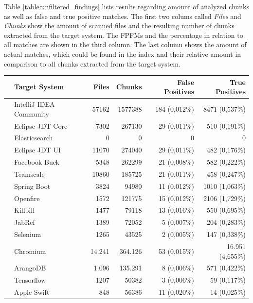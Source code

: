 Table \autoref{table:unfiltered_findings} lists results regarding amount of analyzed chunks as well as false and true positive matches.
The first two colums called \textit{Files} and \textit{Chunks} show the amount of scanned files and the resulting number of chunks extracted from the target system.
The FPFMs and the percentage in relation to all matches are shown in the third column.
The last column shows the amount of actual matches, which could be found in the index and their relative amount in comparison to all chunks extracted from the target system.

\begin{table}[ht]
	\centering
	\begin{tabular}{l|lrrrr}
		 & \textbf{Target System} & \textbf{Files} & \textbf{Chunks} & \textbf{False Positives} & \textbf{True Positives} \\ 
		\hline 
		\parbox[t]{2mm}{} 
		& IntelliJ IDEA Community & 57162 & 1577388 & 184 (0,012\%) & 8471 (0,537\%) \\
		& Eclipse JDT Core & 7302 & 267130 & 29 (0,011\%) & 510 (0,191\%) \\
		& Elasticsearch & 0 & 0 & 0 & 0  \\
		& Eclipse JDT UI & 11070 & 274040 & 29 (0,011\%) & 482 (0,176\%) \\
		& Facebook Buck & 5348 & 262299 & 21 (0,008\%) & 582 (0,222\%) \\
		& Teamscale & 10860 & 185725 & 21 (0,011\%) & 458 (0,247\%) \\
		& Spring Boot & 3824 & 94980 & 11 (0,012\%) & 1010 (1,063\%) \\
		& Openfire & 1572 & 121775 & 15 (0,012\%) & 2106 (1,729\%) \\
		& Killbill & 1477 & 79118 & 13 (0,016\%) & 550 (0,695\%) \\
		& JabRef & 1389 & 72052 & 5 (0,007\%) & 204 (0,283\%) \\
		& Selenium & 1265 & 43525 & 2 (0,005\%) & 147 (0,338\%) \\
		\hline 
		\parbox[t]{2mm}{} 
		& Chromium & 14.241 & 364.126 & 53 (0,015\%) & 16.951 (4,655\%) \\
		& ArangoDB & 1.096 & 135.291 & 8 (0,006\%) & 571 (0,422\%) \\
		& Tensorflow & 1207 & 50382 & 3 (0,006\%) & 59 (0,117\%) \\
		& Apple Swift & 848 & 56386 & 11 (0,020\%) & 14 (0,025\%) \\

\end{tabular}
\end{table}
